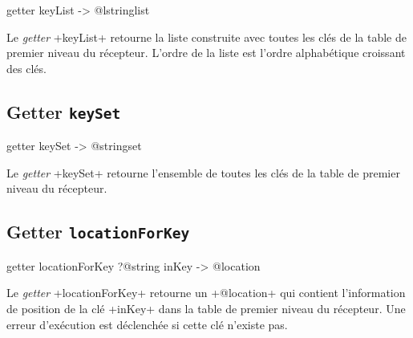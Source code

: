 \begin{galgas}
getter keyList -> @lstringlist
\end{galgas}


Le \emph{getter} \ggs+keyList+ retourne la liste construite avec toutes les clés de la table de premier niveau du récepteur. L'ordre de la liste est l'ordre alphabétique croissant des clés.



\subsection{Getter \texttt{keySet}}

\begin{galgas}
getter keySet -> @stringset
\end{galgas}


Le \emph{getter} \ggs+keySet+ retourne l'ensemble de toutes les clés de la table de premier niveau du récepteur.





\subsection{Getter \texttt{locationForKey}}

\begin{galgas}
getter locationForKey ?@string inKey -> @location
\end{galgas}


Le \emph{getter} \ggs+locationForKey+ retourne un \ggs+@location+ qui contient l'information de position de la clé \ggs+inKey+ dans la table de premier niveau du récepteur. Une erreur d'exécution est déclenchée si cette clé n'existe pas.








%
%
%









